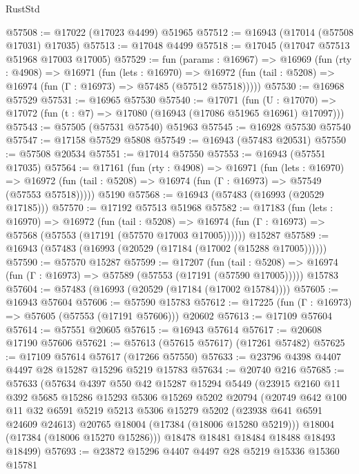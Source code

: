 \begin{lexlean}{RustStd}
\begin{coremodule}
@57508 := @17022 (@17023 @4499) @51965
@57512 := @16943 (@17014 (@57508 @17031) @17035)
@57513 := @17048 @4499
@57518 := @17045 (@17047 @57513 @51968 @17003 @17005)
@57529 := fun (params : @16967) =>
  @16969
    (fun (rty : @4908) =>
    @16971
      (fun (lets : @16970) =>
      @16972 (fun (tail : @5208) => @16974 (fun (Γ : @16973) => @57485 (@57512 @57518)))))
@57530 := @16968 @57529
@57531 := @16965 @57530
@57540 := @17071
    (fun (U : @17070) => @17072 (fun (t : @7) => @17080 (@16943 (@17086 @51965 @16961) @17097)))
@57543 := @57505 (@57531 @57540) @51963
@57545 := @16928 @57530 @57540
@57547 := @17158 @57529 @5808
@57549 := @16943 (@57483 @20531)
@57550 := @57508 @20534
@57551 := @17014 @57550
@57553 := @16943 (@57551 @17035)
@57564 := @17161
    (fun (rty : @4908) =>
    @16971
      (fun (lets : @16970) =>
      @16972 (fun (tail : @5208) => @16974 (fun (Γ : @16973) => @57549 (@57553 @57518)))))
    @5190
@57568 := @16943 (@57483 (@16993 (@20529 @17185)))
@57570 := @17192 @57513 @51968
@57582 := @17183
    (fun (lets : @16970) =>
    @16972
      (fun (tail : @5208) =>
      @16974 (fun (Γ : @16973) => @57568 (@57553 (@17191 (@57570 @17003 @17005))))))
    @15287
@57589 := @16943 (@57483 (@16993 (@20529 (@17184 (@17002 (@15288 @17005))))))
@57590 := @57570 @15287
@57599 := @17207
    (fun (tail : @5208) => @16974 (fun (Γ : @16973) => @57589 (@57553 (@17191 (@57590 @17005)))))
    @15783
@57604 := @57483 (@16993 (@20529 (@17184 (@17002 @15784))))
@57605 := @16943 @57604
@57606 := @57590 @15783
@57612 := @17225 (fun (Γ : @16973) => @57605 (@57553 (@17191 @57606))) @20602
@57613 := @17109 @57604
@57614 := @57551 @20605
@57615 := @16943 @57614
@57617 := @20608 @17190 @57606
@57621 := @57613 (@57615 @57617) (@17261 @57482)
@57625 := @17109 @57614 @57617 (@17266 @57550)
@57633 := @23796 @4398 @4407 @4497 @28 @15287 @15296 @5219 @15783
@57634 := @20740 @216
@57685 := @57633
    (@57634
      @4397
      @550
      @42
      @15287
      @15294
      @5449
      (@23915
        @2160
        @11
        @392
        @5685
        @15286
        @15293
        @5306
        @15269
        @5202
        @20794
        (@20749
          @642
          @100
          @11
          @32
          @6591
          @5219
          @5213
          @5306
          @15279
          @5202
          (@23938 @641 @6591 @24609 @24613)
          @20765
          @18004
          (@17384 (@18006 @15280 @5219)))
        @18004
        (@17384 (@18006 @15270 @15286)))
      @18478
      @18481
      @18484
      @18488
      @18493
      @18499)
@57693 := @23872 @15296 @4407 @4497 @28 @5219 @15336 @15360 @15781

\end{coremodule}
\end{lexlean}
